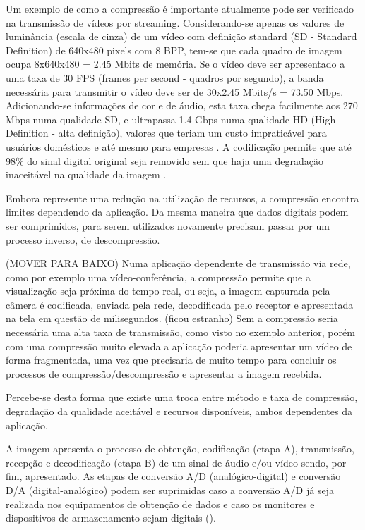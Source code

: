 Um exemplo de como a compressão é importante atualmente pode ser verificado na transmissão de vídeos por streaming. Considerando-se apenas os valores de luminância (escala de cinza) de um vídeo com definição standard (SD - Standard Definition) de 640x480 pixels com 8 BPP, tem-se que cada quadro de imagem ocupa 8x640x480 = 2.45 Mbits de memória. Se o vídeo deve ser apresentado a uma taxa de 30 FPS (frames per second - quadros por segundo), a banda necessária para transmitir o vídeo deve ser de 30x2.45 Mbits/s = 73.50 Mbps. Adicionando-se informações de cor e de áudio, esta taxa chega facilmente aos 270 Mbps numa qualidade SD, e ultrapassa 1.4 Gbps numa qualidade HD (High Definition - alta definição), valores que teriam um custo impraticável para usuários domésticos e até mesmo para empresas \cite{ciscoieee}. A codificação permite que até 98\% do sinal digital original seja removido sem que haja uma degradação inaceitável na qualidade da imagem \cite{mpeg2ref}.

Embora represente uma redução na utilização de recursos, a compressão encontra limites dependendo da aplicação. Da mesma maneira que dados digitais podem ser comprimidos, para serem utilizados novamente precisam passar por um processo inverso, de descompressão.

(MOVER PARA BAIXO) Numa aplicação dependente de transmissão via rede, como por exemplo uma vídeo-conferência, a compressão permite que a visualização seja próxima do tempo real, ou seja, a imagem capturada pela câmera é codificada, enviada pela rede, decodificada pelo receptor e apresentada na tela em questão de milisegundos. (ficou estranho) Sem a compressão seria necessária uma alta taxa de transmissão, como visto no exemplo anterior, porém com uma compressão muito elevada a aplicação poderia apresentar um vídeo de forma fragmentada, uma vez que precisaria de muito tempo para concluir os processos de compressão/descompressão e apresentar a imagem recebida.

Percebe-se desta forma que existe uma troca entre método e taxa de compressão, degradação da qualidade aceitável e recursos disponíveis, ambos dependentes da aplicação.

A imagem apresenta o processo de obtenção, codificação (etapa A), transmissão, recepção e decodificação (etapa B) de um sinal de áudio e/ou vídeo sendo, por fim, apresentado. As etapas de conversão A/D (analógico-digital) e conversão D/A (digital-analógico) podem ser suprimidas caso a conversão A/D já seja realizada nos equipamentos de obtenção de dados e caso os monitores e dispositivos de armazenamento sejam digitais (\cite{rehme}).

